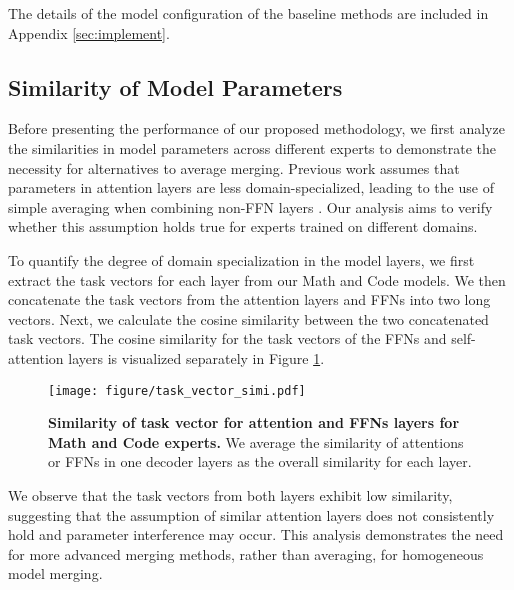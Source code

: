 The details of the model configuration of the baseline methods are included in Appendix \ref{sec:implement}.

\subsection{Similarity of Model Parameters}

Before presenting the performance of our proposed methodology, we first analyze the similarities in model parameters across different experts to demonstrate the necessity for alternatives to average merging. Previous work assumes that parameters in attention layers are less domain-specialized, leading to the use of simple averaging when combining non-FFN layers \cite{sukhbaatar2024branchtrainmixmixingexpertllms}. Our analysis aims to verify whether this assumption holds true for experts trained on different domains.


To quantify the degree of domain specialization in the model layers, we first extract the task vectors for each layer from our Math and Code \llama models. We then concatenate the task vectors from the attention layers and FFNs into two long vectors. Next, we calculate the cosine similarity between the two concatenated task vectors. The cosine similarity for the task vectors of the FFNs and self-attention layers is visualized separately in Figure \ref{fig:simi_task_vector}.

\begin{figure}[!htb]
     \centering
     \texttt{[image: figure/task\_vector\_simi.pdf]}
     \caption{\textbf{Similarity of task vector for attention and FFNs layers for Math and Code \llama experts.} We average the similarity of attentions or FFNs in one decoder layers as the overall similarity for each layer.}
     \label{fig:simi_task_vector}
\end{figure}

We observe that the task vectors from both layers exhibit low similarity, suggesting that the assumption of similar attention layers does not consistently hold and parameter interference may occur. This analysis demonstrates the need for more advanced merging methods, rather than averaging, for homogeneous model merging. 

